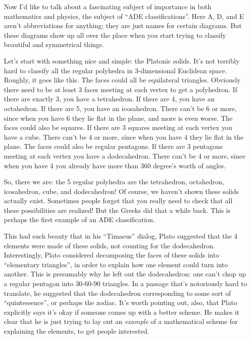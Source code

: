 \documentclass{article}
\begin{document}
Now I'd like to talk about a fascinating subject of importance in both
mathematics and physics, the subject of ``ADE classifications''. Here A,
D, and E aren't abbreviations for anything; they are just names for
certain diagrams. But these diagrams show up all over the place when you
start trying to classify beautiful and symmetrical things.

Let's start with something nice and simple: the Platonic solids. It's
not terribly hard to classify all the regular polyhedra in 3-dimensional
Euclidean space. Roughly, it goes like this. The faces could all be
equilateral triangles. Obviously there need to be at least 3 faces
meeting at each vertex to get a polyhedron. If there are exactly 3, you
have a tetrahedron. If there are 4, you have an octahedron. If there are
5, you have an icosahedron. There can't be 6 or more, since when you
have 6 they lie flat in the plane, and more is even worse. The faces
could also be squares. If there are 3 squares meeting at each vertex you
have a cube. There can't be 4 or more, since when you have 4 they lie
flat in the plane. The faces could also be regular pentagons. If there
are 3 pentagons meeting at each vertex you have a dodecahedron. There
can't be 4 or more, since when you have 4 you already have more than 360
degree's worth of angles.

So, there we are: the 5 regular polyhedra are the tetrahedron,
octahedron, icosahedron, cube, and dodecahedron! Of course, we haven't
shown these solids actually exist. Sometimes people forget that you
really need to check that all these possibilities are realized! But the
Greeks did that a while back. This is perhaps the first example of an
ADE classification.

This had such beauty that in his ``Timaeus'' dialog, Plato suggested
that the 4 elements were made of these solids, not counting for the
dodecahedron. Interestingly, Plato considered decomposing the faces of
these solids into ``elementary triangles'', in order to explain how one
element could turn into another. This is presumably why he left out the
dodecahedron: one can't chop up a regular pentagon into 30-60-90
triangles. In a passage that's notoriously hard to translate, he
suggested that the dodecahedron corresponding to some sort of
``quintessence'', or perhaps the zodiac. It's worth pointing out, also,
that Plato explicitly says it's okay if someone comes up with a better
scheme. He makes it clear that he is just trying to lay out an
\emph{example} of a mathematical scheme for explaining the elements, to
get people interested.
\end{document}
